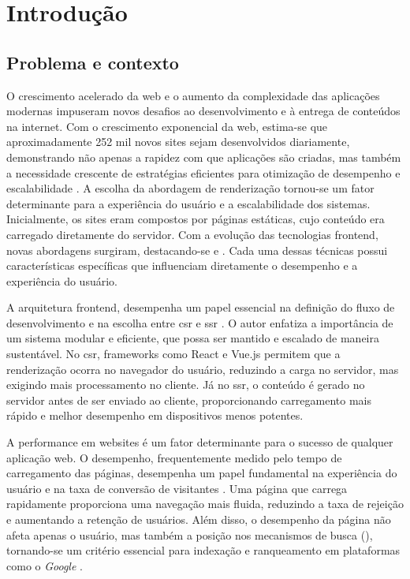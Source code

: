 \chapter{Introdução}
\label{cap:introducao}

\section{Problema e contexto}
O crescimento acelerado da web e o aumento da complexidade das aplicações modernas impuseram novos desafios ao desenvolvimento e à entrega de conteúdos na internet. Com o crescimento exponencial da web, estima-se que aproximadamente 252 mil novos sites sejam desenvolvidos diariamente, demonstrando não apenas a rapidez com que aplicações são criadas, mas também a necessidade crescente de estratégias eficientes para otimização de desempenho e escalabilidade \cite{dataInternetUsage}. A escolha da abordagem de renderização tornou-se um fator determinante para a experiência do usuário e a escalabilidade dos sistemas. Inicialmente, os sites eram compostos por páginas estáticas, cujo conteúdo era carregado diretamente do servidor. Com a evolução das tecnologias frontend, novas abordagens surgiram, destacando-se  e . Cada uma dessas técnicas possui características específicas que influenciam diretamente o desempenho e a experiência do usuário.

A arquitetura frontend, desempenha um papel essencial na definição do fluxo de desenvolvimento e na escolha entre \acrshort{csr} e \acrshort{ssr} \cite{frontendGodbolt}. O autor enfatiza a importância de um sistema modular e eficiente, que possa ser mantido e escalado de maneira sustentável. No \acrshort{csr}, frameworks como React e Vue.js permitem que a renderização ocorra no navegador do usuário, reduzindo a carga no servidor, mas exigindo mais processamento no cliente. Já no \acrshort{ssr}, o conteúdo é gerado no servidor antes de ser enviado ao cliente, proporcionando carregamento mais rápido e melhor desempenho em dispositivos menos potentes.

A performance em websites é um fator determinante para o sucesso de qualquer aplicação web. O desempenho, frequentemente medido pelo tempo de carregamento das páginas, desempenha um papel fundamental na experiência do usuário e na taxa de conversão de visitantes \cite{webPerformance}. Uma página que carrega rapidamente proporciona uma navegação mais fluida, reduzindo a taxa de rejeição e aumentando a retenção de usuários. Além disso, o desempenho da página não afeta apenas o usuário, mas também a posição nos mecanismos de busca (), tornando-se um critério essencial para indexação e ranqueamento em plataformas como o \emph{Google} \cite{google}.

